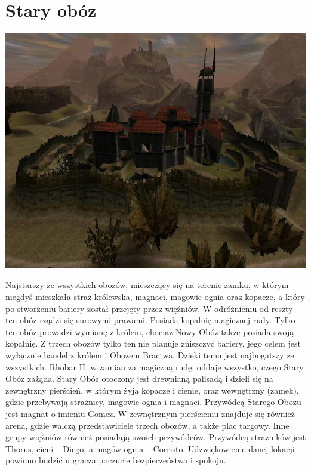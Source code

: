 \documentclass[11pt,polish, openany]{book}
\begin{document}
\section{Stary obóz}
\begin{center}
 \includegraphics[scale=0.6]{staryoboz.jpg}
\end{center}
Najstarszy ze wszystkich obozów, mieszczący się na terenie zamku, w którym niegdyś mieszkała straż królewska, magnaci, magowie ognia oraz kopacze, a który po stworzeniu bariery został przejęty przez więźniów. W odróżnieniu od reszty ten obóz rządzi się surowymi prawami. Posiada kopalnię magicznej rudy. Tylko ten obóz prowadzi wymianę z królem, chociaż Nowy Obóz także posiada swoją kopalnię. Z trzech obozów tylko ten nie planuje zniszczyć bariery, jego celem jest wyłącznie handel z królem i Obozem Bractwa. Dzięki temu jest najbogatszy ze wszystkich. Rhobar II, w zamian za magiczną rudę, oddaje wszystko, czego Stary Obóz zażąda. Stary Obóz otoczony jest drewnianą palisadą i dzieli się na zewnętrzny pierścień, w którym żyją kopacze i cienie, oraz wewnętrzny (zamek), gdzie przebywają strażnicy, magowie ognia i magnaci. Przywódcą Starego Obozu jest magnat o imieniu Gomez. W zewnętrznym pierścieniu znajduje się również arena, gdzie walczą przedstawiciele trzech obozów, a także plac targowy. Inne grupy więźniów również posiadają swoich przywódców. Przywódcą strażników jest Thorus, cieni – Diego, a magów ognia – Corristo. Udzwiękowienie danej lokacji powinno budzić u gracza poczucie bezpieczeństwa i spokoju.
\end{document}
